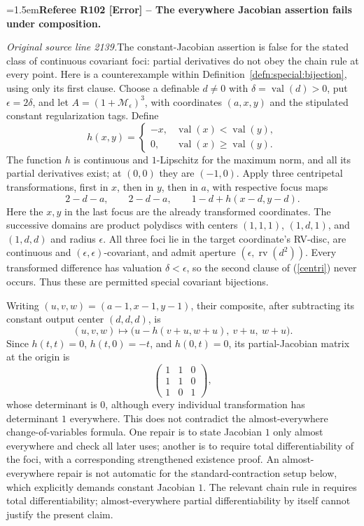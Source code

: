 \documentclass[12pt]{amsart}
\newcommand{\RefereeRemark}[4]{%
  \par\medskip\begingroup\normalfont\small\color{RefereePurple}%
  \emergencystretch=1.5em\noindent\textbf{Referee R#1 [#2] -- #3.}\par\nobreak\noindent #4\par
  \endgroup\medskip
}
\theoremstyle{plain}
\theoremstyle{definition}
\theoremstyle{remark}
\numberwithin{equation}{section}
\theoremstyle{plain}
\newcommand{\MM}{\mdl M}
\newcommand{\0}{\emptyset}
\newcommand{\mdl}[1]{\mathcal{#1}}  %
\DeclareMathOperator{\rv}{rv}
\DeclareMathOperator{\vv}{val}
\begin{document}
\RefereeRemark{102}{Error}{The everywhere Jacobian assertion fails under composition}{%
\textit{Original source line 2139.}\quad The constant-Jacobian assertion is false for the stated class of continuous covariant foci: partial derivatives do not obey the chain rule at every point. Here is a counterexample within Definition~\ref{defn:special:bijection}, using only its first clause. Choose a definable $d\ne0$ with $\delta=\vv(d)>0$, put $\epsilon=2\delta$, and let $A=(1+\MM_\epsilon)^3$, with coordinates $(a,x,y)$ and the stipulated constant regularization tags. Define
\[
h(x,y)=\begin{cases}-x,&\vv(x)<\vv(y),\\0,&\vv(x)\geq\vv(y).\end{cases}
\]
The function $h$ is continuous and $1$-Lipschitz for the maximum norm, and all its partial derivatives exist; at $(0,0)$ they are $(-1,0)$. Apply three centripetal transformations, first in $x$, then in $y$, then in $a$, with respective focus maps
\[
2-d-a,\qquad 2-d-a,\qquad 1-d+h(x-d,y-d).
\]
Here the $x,y$ in the last focus are the already transformed coordinates. The successive domains are product polydiscs with centers $(1,1,1)$, $(1,d,1)$, and $(1,d,d)$ and radius $\epsilon$. All three foci lie in the target coordinate's RV-disc, are continuous and $(\epsilon,\epsilon)$-covariant, and admit aperture $(\epsilon,\rv(d^2))$. Every transformed difference has valuation $\delta<\epsilon$, so the second clause of (\ref{centri}) never occurs. Thus these are permitted special covariant bijections.

Writing $(u,v,w)=(a-1,x-1,y-1)$, their composite, after subtracting its constant output center $(d,d,d)$, is
\[
(u,v,w)\longmapsto
\bigl(u-h(v+u,w+u),\ v+u,\ w+u\bigr).
\]
Since $h(t,t)=0$, $h(t,0)=-t$, and $h(0,t)=0$, its partial-Jacobian matrix at the origin is
\[
\begin{pmatrix}1&1&0\\1&1&0\\1&0&1\end{pmatrix},
\]
whose determinant is $0$, although every individual transformation has determinant $1$ everywhere. This does not contradict the almost-everywhere change-of-variables formula. One repair is to state Jacobian $1$ only almost everywhere and check all later uses; another is to require total differentiability of the foci, with a corresponding strengthened existence proof. An almost-everywhere repair is not automatic for the standard-contraction setup below, which explicitly demands constant Jacobian $1$. The relevant chain rule in \cite[Lemma~9.7]{Yin:special:trans} requires total differentiability; almost-everywhere partial differentiability by itself cannot justify the present claim.
}
\end{document}
